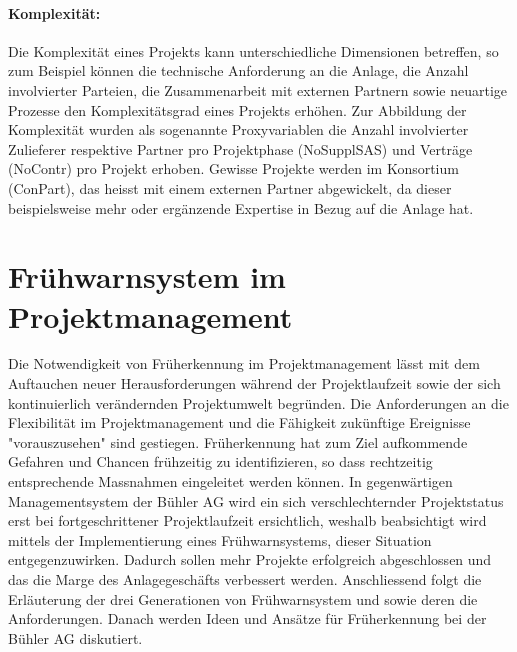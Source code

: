 \paragraph{Komplexität:} Die Komplexität eines Projekts kann unterschiedliche Dimensionen betreffen, so zum Beispiel können die technische Anforderung an die Anlage, die Anzahl involvierter Parteien, die Zusammenarbeit mit externen Partnern sowie neuartige Prozesse den Komplexitätsgrad eines Projekts erhöhen. Zur Abbildung der Komplexität wurden als sogenannte Proxyvariablen die Anzahl involvierter Zulieferer respektive Partner pro Projektphase (NoSupplSAS) und Verträge (NoContr) pro Projekt erhoben. Gewisse Projekte werden im Konsortium (ConPart), das heisst mit einem externen Partner abgewickelt, da dieser beispielsweise mehr oder ergänzende Expertise in Bezug auf die Anlage hat.
%
\section{Frühwarnsystem im Projektmanagement}
Die Notwendigkeit von Früherkennung im Projektmanagement lässt mit dem Auftauchen neuer Herausforderungen während der Projektlaufzeit sowie der sich kontinuierlich verändernden Projektumwelt begründen. Die Anforderungen an die Flexibilität im Projektmanagement und die Fähigkeit zukünftige Ereignisse "vorauszusehen" sind gestiegen. Früherkennung hat zum Ziel aufkommende Gefahren und Chancen frühzeitig zu identifizieren, so dass rechtzeitig entsprechende Massnahmen eingeleitet werden können. In gegenwärtigen Managementsystem der Bühler AG wird ein sich verschlechternder Projektstatus erst bei fortgeschrittener Projektlaufzeit ersichtlich, weshalb beabsichtigt wird mittels der Implementierung eines Frühwarnsystems, dieser Situation entgegenzuwirken. Dadurch sollen mehr Projekte erfolgreich abgeschlossen und das die Marge des Anlagegeschäfts verbessert werden. Anschliessend folgt die Erläuterung der drei Generationen von Frühwarnsystem und sowie deren die Anforderungen. Danach werden Ideen und Ansätze für Früherkennung bei der Bühler AG diskutiert.
